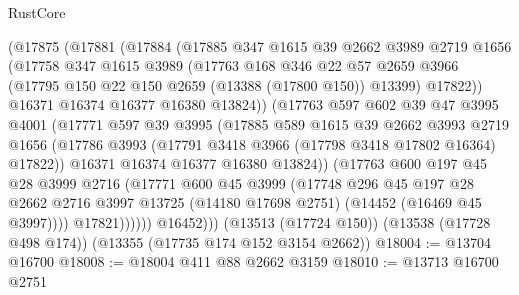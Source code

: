 \begin{lexlean}{RustCore}
\begin{coremodule}
              (@17875
                (@17881
                  (@17884
                    (@17885
                      @347
                      @1615
                      @39
                      @2662
                      @3989
                      @2719
                      @1656
                      (@17758
                        @347
                        @1615
                        @3989
                        (@17763
                          @168
                          @346
                          @22
                          @57
                          @2659
                          @3966
                          (@17795 @150 @22 @150 @2659 (@13388 (@17800 @150)) @13399)
                          @17822))
                      @16371
                      @16374
                      @16377
                      @16380
                      @13824))
                  (@17763
                    @597
                    @602
                    @39
                    @47
                    @3995
                    @4001
                    (@17771
                      @597
                      @39
                      @3995
                      (@17885
                        @589
                        @1615
                        @39
                        @2662
                        @3993
                        @2719
                        @1656
                        (@17786 @3993 (@17791 @3418 @3966 (@17798 @3418 @17802 @16364) @17822))
                        @16371
                        @16374
                        @16377
                        @16380
                        @13824))
                    (@17763
                      @600
                      @197
                      @45
                      @28
                      @3999
                      @2716
                      (@17771
                        @600
                        @45
                        @3999
                        (@17748
                          @296
                          @45
                          @197
                          @28
                          @2662
                          @2716
                          @3997
                          @13725
                          (@14180 @17698 @2751)
                          (@14452 (@16469 @45 @3997))))
                      @17821))))))
          @16452)))
    (@13513 (@17724 @150))
    (@13538 (@17728 @498 @174))
    (@13355 (@17735 @174 @152 @3154 @2662))
@18004 := @13704 @16700
@18008 := @18004 @411 @88 @2662 @3159
@18010 := @13713 @16700 @2751

\end{coremodule}
\end{lexlean}
